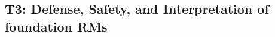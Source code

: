 \documentclass[11pt,letterpaper]{article}
\begin{document}



\subsection{T3: Defense, Safety, and Interpretation of foundation RMs} \label{sec:t3}
\end{document}
